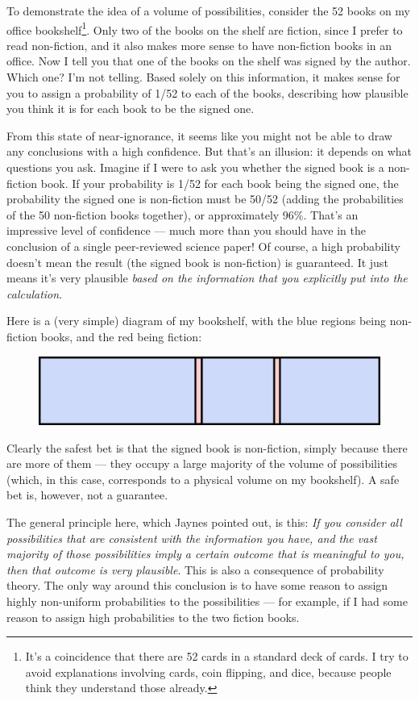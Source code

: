 \documentclass[a4paper, 12pt]{article}
\begin{document}
To demonstrate the idea of a volume of possibilities,
consider the 52 books on my office bookshelf\footnote{It's
a coincidence that there are 52 cards in a standard
deck of cards. I try to avoid explanations involving cards, coin flipping, and
dice, because people think they understand those already.}.
Only two of the books on the shelf are fiction, since I prefer to read
non-fiction, and it also makes more sense to have non-fiction books in an
office. Now I tell you that one of the books on the shelf was
signed by the author. Which one? I'm not telling. Based solely on this
information, it makes sense for you to assign a probability of 1/52 to each of the
books, describing how plausible you think it is for each book to be the signed
one.

From this state of near-ignorance, it seems like you might not be able to draw
any conclusions with a high confidence. But that's an illusion: it depends on
what questions you ask. Imagine if I were to ask you whether the signed book
is a non-fiction book. If your probability is 1/52 for each book being the
signed one, the probability the signed one is non-fiction must be
50/52 (adding the probabilities of the 50 non-fiction books together), 
or approximately 96\%. That's an impressive level of confidence --- much more than you should have in the conclusion of a single peer-reviewed science paper!
Of course, a high probability doesn't mean the result (the signed book is
non-fiction) is guaranteed. It just means it's very plausible {\em based on the
information that you explicitly put into the calculation}.

Here is a (very simple) diagram of my bookshelf, with the blue regions
being non-fiction books, and the red being fiction:
\begin{figure}[ht!]
\centering
\includegraphics{bookshelf.png}
\end{figure}
Clearly the safest bet is that the signed book is non-fiction, simply because
there are more of them --- they occupy a large majority of the volume of
possibilities (which, in this case, corresponds to a physical volume on my
bookshelf). A safe bet is, however, not a guarantee.

The general principle here, which Jaynes pointed out, is this:
{\em If you consider all possibilities that are consistent with
the information you have, and the vast majority of those possibilities
imply a certain outcome that is meaningful to you, then that outcome is very
plausible}. This is also a consequence of probability theory. The only
way around this conclusion is to have some reason to assign highly
non-uniform probabilities to the possibilities --- for example, if I had
some reason to assign high probabilities to the two fiction books.
\end{document}
